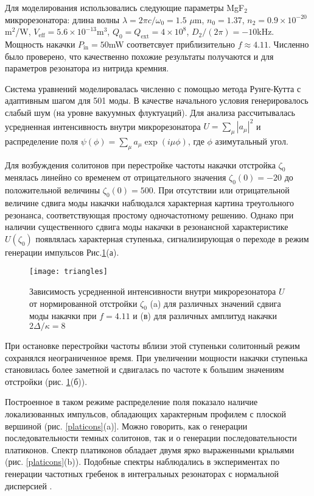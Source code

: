 Для моделирования использовались следующие параметры MgF$_2$ микрорезонатора: длина волны $\lambda=2\pi c/\omega_0=1.5$ $\mu$m, $n_0=1.37$, $n_2=0.9\times 10^{-20}$ m$^2$/W, $V_{\mathrm{eff}}=5.6\times 10^{-13}$m$^3$,  $Q_0=Q_\text{ext}=4\times 10^8$, $D_2/(2\pi)=-10$kHz. Мощность накачки $P_\mathrm{in}=50$mW соответсвует приблизительно $f\approx 4.11$. Численно было проверено, что качественно похожие результаты получаются и для параметров резонатора из нитрида кремния\cite{Brasch2016}.

Система уравнений моделировалась численно с помощью метода Рунге-Кутта с адаптивным шагом для 501 моды. В качестве начального условия генерировалось слабый шум (на уровне вакуумных флуктуаций). Для анализа рассчитывалась усредненная интенсивность внутри микрорезонатора $U=\sum_\mu |a_\mu|^2$ и распределение поля $\psi(\phi)=\sum_\mu a_\mu \exp(i\mu\phi)$, где $\phi$ азимутальный угол.

Для возбуждения солитонов при перестройке частоты накачки отстройка $\zeta_0$ менялась линейно со временем от отрицательного значения $\zeta_0(0)=-20$ до положительной величины $\zeta_0(0)=500$.  При отсутствии или отрицательной величине сдвига моды накачки наблюдался характерная картина треугольного резонанса, соответствующая простому одночастотному решению. Однако при наличии существенного сдвига моды накачки в резонансной характеристике $U(\zeta_0)$ появлялась характерная ступенька, сигнализирующая о переходе в режим генерации импульсов Рис.\ref{platicon_triangles}(а).

\begin{figure}
  \centering
  \texttt{[image: triangles]}
  \caption{Зависимость усредненной интенсивности внутри микрорезонатора $U$ от нормированной отстройки $\zeta_0$ (a) для различных значений сдвига моды накачки при $f=4.11$ и (в) для различных амплитуд накачки $2\Delta/\kappa=8$} \label{platicon_triangles}
\end{figure}

При остановке перестройки частоты вблизи этой ступеньки солитонный режим сохранялся неограниченное время.
При увеличении мощности накачки ступенька становилась более заметной и сдвигалась по частоте к большим значениям отстройки (рис. \ref{platicon_triangles}(б)).

Построенное в таком режиме распределение поля показало наличие локализованных импульсов, обладающих характерным профилем с плоской вершиной (рис. \ref{platicons}(a)]. Можно говорить, как о генерации последовательности темных солитонов, так и о генерации последовательности платиконов. Спектр платиконов обладает двумя ярко выраженными крыльями (рис. \ref{platicons}(b)). Подобные спектры наблюдались в экспериментах по генерации частотных гребенок в интегральных резонаторах с нормальной дисперсией \cite{Huang2015prl}.

